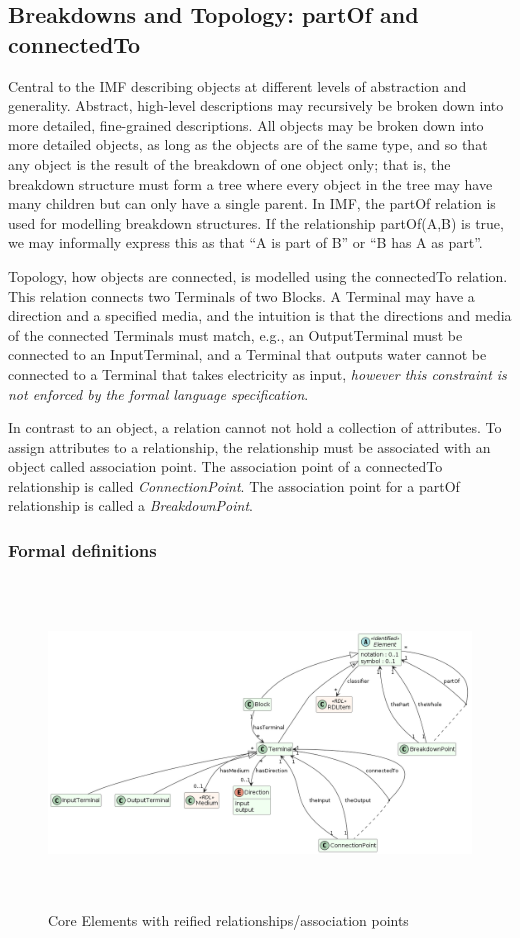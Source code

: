 \subsection{Breakdowns and Topology: partOf and connectedTo}
Central to the IMF describing objects at different levels of abstraction and generality.
Abstract, high-level descriptions may recursively be broken down into more detailed, fine-grained descriptions. All
objects may be broken down into more detailed objects, as long as the objects are of the same type, and so that any
object is the result of the breakdown of one object only; that is, the breakdown structure must form a tree where
every object in the tree may have many children but can only have a single parent. In IMF, the partOf relation is
used for modelling breakdown structures. If the relationship partOf(A,B) is true, we may informally express this as
that ``A is part of B'' or ``B has A as part''.

Topology, how objects are connected, is modelled using the connectedTo relation. This relation connects two Terminals
of two Blocks. A Terminal may have a direction and a specified media, and the intuition is that the directions and media of the
connected Terminals must match, e.g., an OutputTerminal must be connected to an InputTerminal, and a Terminal that
outputs water cannot be connected to a Terminal that takes electricity as input, \emph{however this constraint is
  not enforced by the formal language specification}.

In contrast to an object, a relation cannot not hold a collection of attributes. To assign attributes to a relationship, the relationship must be associated with an object called
association point. The association point of a connectedTo relationship is called \emph{ConnectionPoint}. The
association point for a partOf relationship is called a \emph{BreakdownPoint}.

\subsubsection{Formal definitions}
\begin{figure}[htb]
  \centering
  \includegraphics[width=6.45834in,height=3.41753in]{img/IMFmanual-img036.png}
  \caption{Core Elements with reified relationships/association points}
  \label{fig:Figure 17}
\end{figure}

